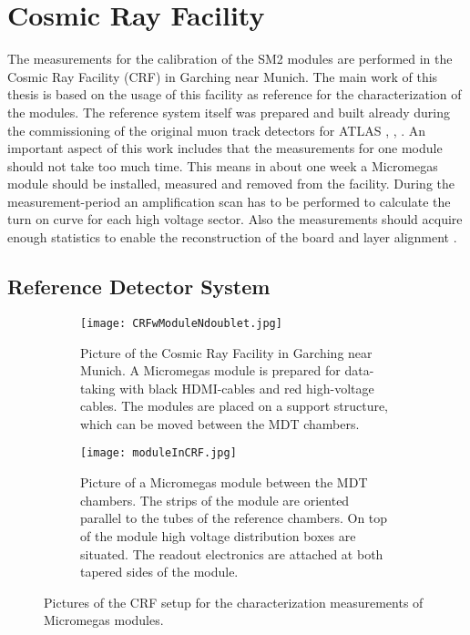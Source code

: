 \documentclass[
twoside,            %
BCOR1.4cm,          %
10pt,               %
headings=normal,    %
headsepline,        %
clearplainpage,		%
final,              %
div=14,
open=right,
bibliography=toc
]{scrreprt}
\begin{document}
\section{Cosmic Ray Facility}

The measurements for the calibration of the SM2 modules are performed in the Cosmic Ray Facility (CRF) in Garching near Munich.
The main work of this thesis is based on the usage of this facility as reference for the characterization of the modules.
The reference system itself was prepared and built already during the commissioning of the original muon track detectors for ATLAS \cite{CRF}, \cite{kortnerThesis}, \cite{rauscherThesis}.
An important aspect of this work includes that the measurements for one module should not take too much time.
This means in about one week a Micromegas module should be installed, measured and removed from the facility.
During the measurement-period an amplification scan has to be performed to calculate the turn on curve for each high voltage sector.
Also the measurements should acquire enough statistics to enable the reconstruction of the board and layer alignment \cite{loeselThesis}.

\subsection{Reference Detector System}

\begin{figure}[!h]
	\begin{subfigure}[b]{0.48\textwidth}
		\centering
		\texttt{[image: CRFwModuleNdoublet.jpg]}
		\caption{
			Picture of the Cosmic Ray Facility in Garching near Munich. 
			A Micromegas module is prepared for data-taking with black HDMI-cables and red high-voltage cables.
			The modules are placed on a support structure, which can be moved between the MDT chambers. 
		}
		\label{CRFpic} 
	\end{subfigure}
	\hfill
	\begin{subfigure}[b]{0.48\textwidth}
		\centering
		\texttt{[image: moduleInCRF.jpg]}
		\caption{
			Picture of a Micromegas module between the MDT chambers.
			The strips of the module are oriented parallel to the tubes of the reference chambers.
			On top of the module high voltage distribution boxes are situated.
			The readout electronics are attached at both tapered sides of the module.
		}
		\label{CRFcoord} 
	\end{subfigure}
	\vspace{-2mm}
	\caption{
		Pictures of the CRF setup for the characterization measurements of Micromegas modules.
	}
	\label{CRFsmall}
\end{figure}
\end{document}
